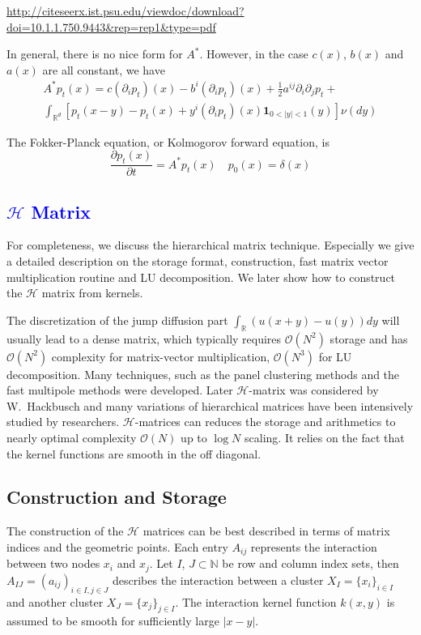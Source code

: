 \documentclass[10pt,a4paper]{article}
\newcommand{\RR}[0]{\mathbb{R}}
\newcommand{\lib}[1]{\textcolor{blue}{\section{#1}}}
\theoremstyle{definition}
\begin{document}
\url{http://citeseerx.ist.psu.edu/viewdoc/download?doi=10.1.1.750.9443&rep=rep1&type=pdf}


 In general, there is no nice form for $A^*$. However, in the case $c(x)$, $b(x)$ and $a(x)$ are all constant, we have
 \begin{multline}
 	A^*p_t(x) = c (\partial_i p_t)(x) - b^i (\partial_i p_t)(x) + \frac{1}{2}a^{ij}\partial_i\partial_j p_t +\\
 	\int_{\RR^d}\left[ p_t( x-y) -p_t(x)+y^i(\partial_i p_t)(x) \mathbf{1}_{0<|y|<1}(y) \right]\nu(dy)
 \end{multline}
 
 The Fokker-Planck equation, or Kolmogorov forward equation, is
 \begin{equation}
 	\frac{\partial p_t(x)}{\partial t} = A^*p_t(x)\quad p_0(x) = \delta(x)
 \end{equation}
 
 
 
\lib{$\mathcal{H}$ Matrix}

For completeness, we discuss the hierarchical matrix technique. Especially we give a detailed description on the storage format, construction, fast matrix vector multiplication routine and LU decomposition. We later show how to construct the $\mathcal{H}$ matrix from kernels. 

The discretization of the jump diffusion part $\int_\RR (u(x+y)-u(y))dy$ will usually lead to a dense matrix, which typically requires $\mathcal{O}(N^2)$ storage and has $\mathcal{O}(N^2)$ complexity for matrix-vector multiplication, $\mathcal{O}(N^3)$ for LU decomposition. Many techniques, such as the panel clustering methods and the fast multipole methods were developed. Later $\mathcal{H}$-matrix was considered by W.~Hackbusch and many variations of hierarchical matrices have been intensively studied by researchers. $\mathcal{H}$-matrices can reduces the storage and arithmetics to nearly optimal complexity $\mathcal{O}(N)$ up to $\log N$ scaling. It relies on the fact that the kernel functions are smooth in the off diagonal. 

\subsection{Construction and Storage}\label{equ:cons}

The construction of the $\mathcal{H}$ matrices can be best described in terms of matrix indices and the geometric points. Each entry $A_{ij}$ represents the interaction between two nodes $x_i$ and $x_j$. Let $I$, $J\subset \mathbb{N}$ be row and column index sets, then $A_{IJ}=(a_{ij})_{i\in I, j\in J}$ describes the interaction between a cluster $X_I = \{x_i\}_{i\in I}$ and another cluster $X_J = \{x_j\}_{j\in I}$. The interaction kernel function $k(x,y)$ is assumed to be smooth for sufficiently large $|x-y|$. 
\end{document}
